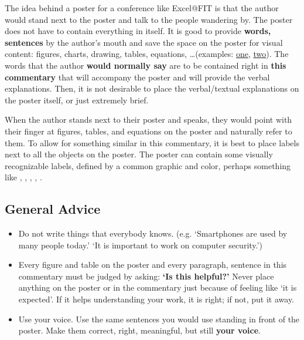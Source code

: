 \documentclass{ExcelAtFIT}
\begin{document}
The idea behind a poster for a conference like Excel@FIT is that the author would stand next to the poster and talk to the people wandering by.
The poster does not have to contain everything in itself.  It is good to provide \textbf{words, sentences} by the author's mouth and save the space on the poster for visual content: figures, charts, drawing, tables, equations, \dots (examples: \href{https://excel.fit.vutbr.cz/submissions/2022/002/2_poster.pdf}{one}, \href{https://excel.fit.vutbr.cz/submissions/2022/010/10_poster.pdf}{two}).  The words that the author \textbf{would normally say} are to be contained right in \textbf{this commentary} that will accompany the poster and will provide the verbal explanations.  Then, it is not desirable to place the verbal/textual explanations on the poster itself, or just extremely brief.

When the author stands next to their poster and speaks, they would point with their finger at figures, tables, and equations on the poster and naturally refer to them.  To allow for something similar in this commentary, it is best to place labels next to all the objects on the poster.  The poster can contain some visually recognizable labels, defined by a common graphic and color, perhaps something like , , , , .


\subsection{General Advice}

\begin{itemize}
    \item Do not write things that everybody knows.  (e.g. `Smartphones are used by many people today.' `It is important to work on computer security.')
    \item Every figure and table on the poster and every paragraph, sentence in this commentary must be judged by asking: \textbf{`Is this helpful?'}  Never place anything on the poster or in the commentary just because of feeling like `it is expected'.  If it helps understanding your work, it is right; if not, put it away.
    \item Use your voice.  Use the same sentences you would use standing in front of the poster.  Make them correct, right, meaningful, but still \textbf{your voice}.
\end{itemize}
\end{document}
